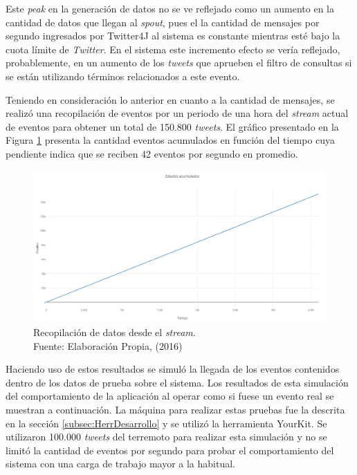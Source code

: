 Este \textit{peak} en la generación de datos no se ve reflejado como un aumento en la cantidad de datos que llegan al \textit{spout}, pues el la cantidad de mensajes por segundo ingresados por Twitter4J al sistema es constante mientras esté bajo la cuota límite de \textit{Twitter}. En el sistema este incremento efecto se vería reflejado, probablemente, en un aumento de los \textit{tweets} que aprueben el filtro de consultas si se están utilizando términos relacionados a este evento.

Teniendo en consideración lo anterior en cuanto a la cantidad de mensajes, se realizó una recopilación de eventos por un periodo de una hora del \textit{stream} actual de eventos para obtener un total de 150.800 \textit{tweets}. El gráfico presentado en la Figura \ref{fig:graficoAcumulado} presenta la cantidad eventos acumulados en función del tiempo cuya pendiente indica que se reciben 42 eventos por segundo en promedio.

\begin{figure}[H]
        \centering
        \captionsetup{justification=centering}
        \includegraphics[scale=0.5]{images/DatosAcumulados.png}
        \caption[Recopilación de datos desde el \textit{stream}.]{Recopilación de datos desde el \textit{stream}.\\Fuente: Elaboración Propia, (2016)}
        \label{fig:graficoAcumulado}
\end{figure}

Haciendo uso de estos resultados se simuló la llegada de los eventos contenidos dentro de los datos de prueba sobre el sistema. Los resultados de esta simulación del comportamiento de la aplicación al operar como si fuese un evento real se muestran a continuación. La máquina para realizar estas pruebas fue la descrita en la sección \ref{subsec:HerrDesarrollo} y se utilizó la herramienta YourKit. Se utilizaron 100.000 \textit{tweets} del terremoto para realizar esta simulación y no se limitó la cantidad de eventos por segundo para probar el comportamiento del sistema con una carga de trabajo mayor a la habitual.

